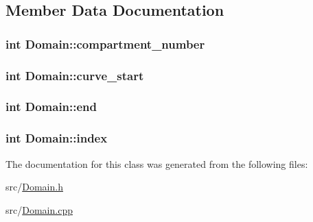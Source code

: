 \subsection{Member Data Documentation}
\hypertarget{class_domain_ae4a3140523f5101fe60b05dbfc280fe1}{}
\subsubsection[{compartment\+\_\+number}]{\setlength{\rightskip}{0pt plus 5cm}int Domain\+::compartment\+\_\+number\hspace{0.3cm}{\ttfamily [private]}}\label{class_domain_ae4a3140523f5101fe60b05dbfc280fe1}
\hypertarget{class_domain_a34957cc9e5ab74e87e7870198eb04ef8}{}
\subsubsection[{curve\+\_\+start}]{\setlength{\rightskip}{0pt plus 5cm}int Domain\+::curve\+\_\+start\hspace{0.3cm}{\ttfamily [private]}}\label{class_domain_a34957cc9e5ab74e87e7870198eb04ef8}
\hypertarget{class_domain_af325c2c3f1cfbbae199d10fb8d7486e1}{}
\subsubsection[{end}]{\setlength{\rightskip}{0pt plus 5cm}int Domain\+::end\hspace{0.3cm}{\ttfamily [private]}}\label{class_domain_af325c2c3f1cfbbae199d10fb8d7486e1}
\hypertarget{class_domain_a0242b8dac23da9fe639f62bda97ea85c}{}
\subsubsection[{index}]{\setlength{\rightskip}{0pt plus 5cm}int Domain\+::index\hspace{0.3cm}{\ttfamily [private]}}\label{class_domain_a0242b8dac23da9fe639f62bda97ea85c}


The documentation for this class was generated from the following files\+:\begin{DoxyCompactItemize}
\item 
src/\hyperlink{_domain_8h}{Domain.\+h}\item 
src/\hyperlink{_domain_8cpp}{Domain.\+cpp}\end{DoxyCompactItemize}
